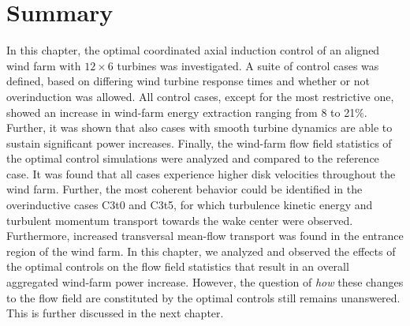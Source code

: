 \section{Summary}\label{sec:opt_ind_summ}
In this chapter, the optimal coordinated axial induction control of an aligned wind farm with $12 \times 6$ turbines was investigated. A suite of control cases was defined, based on differing wind turbine response times and whether or not overinduction was allowed. All control cases, except for the most restrictive one, showed an increase in wind-farm energy extraction ranging from 8 to 21$\%$. Further, it was shown that also cases with smooth turbine dynamics are able to sustain significant power increases. Finally, the wind-farm flow field statistics of the optimal control simulations were analyzed and compared to the reference case. It was found that all cases experience higher disk velocities throughout the wind farm. Further, the most coherent behavior could be identified in the overinductive cases C3t0 and C3t5, for which turbulence kinetic energy and turbulent momentum transport towards the wake center were observed. Furthermore, increased transversal mean-flow transport was found in the entrance region of the wind farm. In this chapter, we analyzed and observed the effects of the optimal controls on the flow field statistics that result in an overall aggregated wind-farm power increase. However, the question of \emph{how} these changes to the flow field are constituted by the optimal controls still remains unanswered. This is further discussed in the next chapter. 

\cleardoublepage